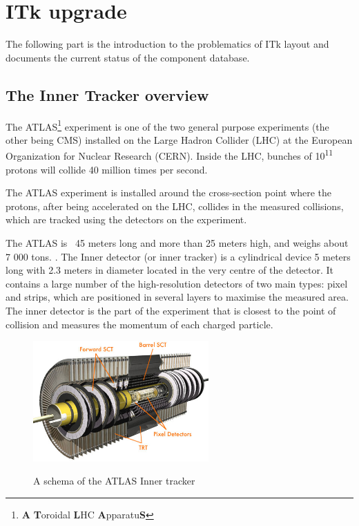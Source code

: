 \chapter{ITk upgrade}
\label{chap:itkUpgrade}

\par The following part is the introduction to the problematics of ITk layout and documents the current status of the component database.

\section{The Inner Tracker overview}
\par The ATLAS\footnote{\textbf{A} \textbf{T}oroidal \textbf{L}HC \textbf{A}pparatu\textbf{S}} experiment is one of the two general purpose experiments (the other being CMS) installed on the Large Hadron Collider (LHC) at the European Organization for Nuclear Research (CERN). Inside the LHC, bunches of 10\textsuperscript{11} protons will collide 40 million times per second.\cite[page 10]{atlasExperiment}


\par The ATLAS experiment is installed around the cross-section point\cite[page 10]{atlasExperiment} where the protons, after being accelerated on the LHC, collides in the measured collisions, which are tracked using the detectors on the experiment. 

\par The ATLAS is ~45 meters long and more than 25 meters high, and weighs about 7 000 tons. \cite{atlasweb}. The Inner detector (or inner tracker) is a cylindrical device 5 meters long with 2.3 meters in diameter \cite[page 10]{atlasExperiment} located in the very centre of the detector. It contains a large number of the high-resolution detectors of two main types: pixel and strips, which are positioned in several layers to maximise the measured area. The inner detector is the part of the experiment that is closest to the point of collision and measures the momentum of each charged particle. \cite{atlasitkweb}


\begin{figure}[!ht]
	\centering
	\includegraphics[width=0.6\textwidth]{img/itk_schema.jpg}\\	
	\caption{A schema of the ATLAS Inner tracker \cite{atlasitkweb}}
\end{figure}

